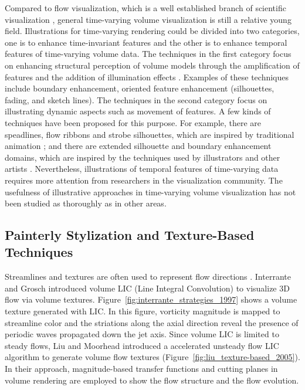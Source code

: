 Compared to flow visualization, which is a well established branch of scientific visualization \cite{brambilla_illustrative_2012}, general time-varying volume visualization is still a relative young field.
Illustrations for time-varying rendering could be divided into two categories, one is to enhance time-invariant features and the other is to enhance temporal features of time-varying volume data. The techniques in the first category focus on enhancing structural perception of volume models through the amplification of features and the addition of illumination effects \cite{rheingans_volume_2001} \cite{joshi_illustration-inspired_2005}. Examples of these techniques include boundary enhancement, oriented feature enhancement (silhouettes, fading, and sketch lines). The techniques in the second category focus on illustrating dynamic aspects such as movement of features. A few kinds of techniques have been proposed for this purpose. For example, there are speadlines, flow ribbons and strobe silhouettes, which are inspired by traditional animation \cite{joshi_illustration-inspired_2005} \cite{joshi_evaluation_2008} \cite{joshi_case_2009}; and there are extended silhouette and boundary enhancement domains, which are inspired by the techniques used by illustrators and other artists \cite{svakhine_illustration_2005}. Nevertheless, illustrations of temporal features of time-varying data requires more attention from researchers in the visualization community. The usefulness of illustrative approaches in time-varying volume visualization has not been studied as thoroughly as in other areas.

\subsection{Painterly Stylization and Texture-Based Techniques \label{painterly_rendering}}
Streamlines and textures are often used to represent flow directions \cite{urnessy_techniques_2004}. Interrante and Grosch \cite{interrante_strategies_1997} introduced volume LIC (Line Integral Convolution) to visualize 3D flow via volume textures. Figure~\ref{fig:interrante_strategies_1997} shows a volume texture generated with LIC. In this figure, vorticity magnitude is mapped to streamline color and the striations along the axial direction reveal the presence of periodic waves propagated down the jet axis. Since volume LIC is limited to steady flows, Liu and Moorhead \cite{liu_texture-based_2005} introduced a accelerated unsteady flow LIC algorithm to generate volume flow textures (Figure~\ref{fig:liu_texture-based_2005}). In their approach, magnitude-based transfer functions and cutting planes in volume rendering are employed to show the flow structure and the flow evolution.

